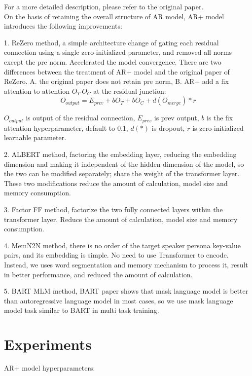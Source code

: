 \documentclass[letterpaper]{article} %
\DeclareRobustCommand{\citeext}[1]{\cite[#1]{#1}}
\begin{document}
For a more detailed description, please refer to the original paper\citeext{Zheng2019}. \\

On the basis of retaining the overall structure of AR model, AR+ model introduces the following improvements: 

1. ReZero\citeext{Bachlechner2020} method, a simple architecture change of gating each residual connection using a single zero-initialized parameter, and removed all norms except the pre norm. Accelerated the model convergence. There are two differences between the treatment of AR+ model and the original paper of ReZero. A. the original paper does not retain pre norm, B. AR+ add a fix attention to attention $O_T~O_C$ at the residual junction: 
\begin{equation}
O_{output} = E_{prev} + bO_T + bO_C + d(O_{merge}) * r
\end{equation}

$O_{output}$ is output of the residual connection, $E_{prev}$ is prev output, $b$ is the fix attention hyperparameter, default to 0.1, $d(*)$ is dropout, $r$ is zero-initialized learnable parameter.

2. ALBERT\citeext{Lan2019} method, factoring the embedding layer, reducing the embedding dimension and making it independent of the hidden dimension of the model, so the two can be modified separately; share the weight of the transformer layer. These two modifications reduce the amount of calculation, model size and memory consumption. 

3. Factor FF method, factorize the two fully connected layers within the transformer layer. Reduce the amount of calculation, model size and memory consumption. 

4. MemN2N\citeext{Sukhbaatar2015} method, there is no order of the target speaker persona key-value pairs, and its embedding is simple. No need to use Transformer to encode. Instead, we uses word segmentation and memory mechanism to process it, result in better performance, and reduced the amount of calculation. 

5. BART MLM\citeext{Lewis2019} method, BART paper shows that mask language model is better than autoregressive language model in most cases, so we use mask language model task similar to BART in multi task training. 

\section[Experiments]{Experiments} 
AR+ model hyperparameters:
\end{document}
